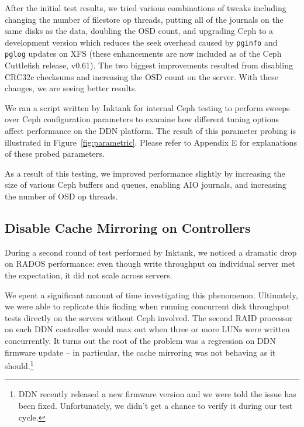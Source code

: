\documentclass{article}
\begin{document}
After the initial test results, we tried various combinations of tweaks
including changing the number of filestore op threads, putting all of the
journals on the same disks as the data, doubling the OSD count, and upgrading
Ceph to a development version which reduces the seek overhead caused by
\texttt{pginfo} and \texttt{pglog} updates on XFS (these enhancements are now
included as of the Ceph Cuttlefish release, v0.61).  The two biggest
improvements resulted from disabling CRC32c checksums and increasing the OSD
count on the server.  With these changes, we are seeing better results.

We ran a script written by Inktank for internal Ceph testing to perform
sweeps over Ceph configuration parameters to examine how different
tuning options affect performance on the DDN platform. The result of this
parameter probing is illustrated in Figure~\ref{fig:parametric}. Please refer
to Appendix E for explanations of these probed parameters.


As a result of this testing, we improved performance slightly by
increasing the size of various Ceph buffers and queues, enabling AIO journals,
and increasing the number of OSD op threads.


\subsection{Disable Cache Mirroring on Controllers}

During a second round of test performed by Inktank, we noticed a dramatic drop
on RADOS performance: even though write throughput on individual server met the
expectation, it did not scale across servers.

We spent a significant amount of time
investigating this phenomenon. Ultimately, we were able to replicate this finding
when running concurrent disk throughput tests directly on the servers without
Ceph involved. The second RAID processor on each DDN controller would max out when
three or more LUNs were written concurrently. It turns out the root of the problem
was a regression on DDN firmware update -- in particular, the cache
mirroring was not behaving as it should.\footnote{DDN recently released a new
firmware version and we were told the issue has been fixed. Unfortunately, we didn't get
a chance to verify it during our test cycle.}

\end{document}
